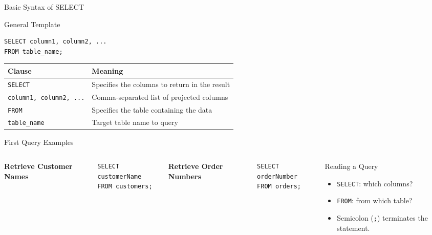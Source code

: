 \documentclass[aspectratio=169,11pt]{beamer}
\newcommand{\kw}[1]{\textcolor{sqlblue}{\texttt{#1}}}
\newcommand{\minihead}[1]{\vspace{2pt}\textbf{#1}\vspace{2pt}}
\begin{document}
\begin{frame}[fragile]{Basic Syntax of SELECT}
\begin{block}{General Template}
\begin{lstlisting}
SELECT column1, column2, ...
FROM table_name;
\end{lstlisting}
\end{block}
\begin{center}
\begin{tabular}{ll}
\toprule
\textbf{Clause} & \textbf{Meaning} \\
\midrule
\kw{SELECT} & Specifies the columns to return in the result \\
\texttt{column1, column2, ...} & Comma-separated list of projected columns \\
\kw{FROM} & Specifies the table containing the data \\
\texttt{table\_name} & Target table name to query \\
\bottomrule
\end{tabular}
\end{center}
\end{frame}

\begin{frame}[fragile]{First Query Examples}
\begin{columns}[T]
\minihead{Retrieve Customer Names}
\begin{lstlisting}
SELECT customerName
FROM customers;
\end{lstlisting}
\minihead{Retrieve Order Numbers}
\begin{lstlisting}
SELECT orderNumber
FROM orders;
\end{lstlisting}
\begin{block}{Reading a Query}
\begin{itemize}
  \item \kw{SELECT}: which columns?
  \item \kw{FROM}: from which table?
  \item Semicolon (\texttt{;}) terminates the statement.
\end{itemize}
\end{block}
\end{columns}
\end{frame}
\end{document}
